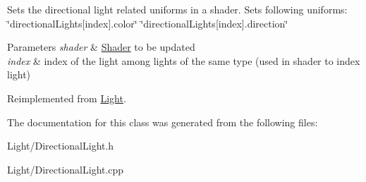 Sets the directional light related uniforms in a shader. Sets following uniforms\+: \char`\"{}directional\+Lights\mbox{[}index\mbox{]}.\+color\char`\"{} \char`\"{}directional\+Lights\mbox{[}index\mbox{]}.\+direction\char`\"{} 
\begin{DoxyParams}{Parameters}
{\em shader} & \mbox{\hyperlink{class_shader}{Shader}} to be updated \\
\hline
{\em index} & index of the light among lights of the same type (used in shader to index light) \\
\hline
\end{DoxyParams}


Reimplemented from \mbox{\hyperlink{class_light_a05d202e42ffec4c8bece9c18b4d4541e}{Light}}.



The documentation for this class was generated from the following files\+:\begin{DoxyCompactItemize}
\item 
Light/Directional\+Light.\+h\item 
Light/Directional\+Light.\+cpp\end{DoxyCompactItemize}
